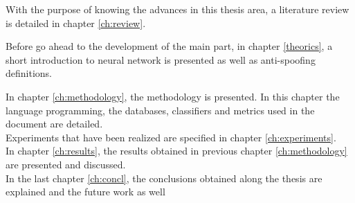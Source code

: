 With the purpose of knowing the advances in this thesis area, a literature review is detailed in chapter \ref{ch:review}.

Before go ahead to the development of the main part, in chapter \ref{theorics}, a short introduction to neural network is presented as well as anti-spoofing definitions.

In chapter \ref{ch:methodology}, the methodology is presented. In this chapter the language programming, the databases, classifiers and metrics used in the document are detailed.\\

Experiments that have been realized are specified in chapter \ref{ch:experiments}.\\

In chapter \ref{ch:results}, the results obtained in previous chapter \ref{ch:methodology} are presented and discussed.\\

In the last chapter \ref{ch:concl}, the conclusions obtained along the thesis are explained and the future work as well\\
